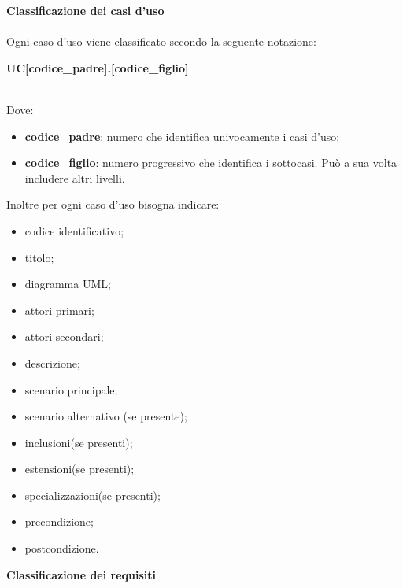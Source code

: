 			\noindent\textbf{Classificazione dei casi d'uso} \mbox{}\\ \mbox{}\\
			\noindent Ogni caso d'uso viene classificato secondo la seguente notazione: \newline \newline
			\centerline{\textbf{UC[codice\_padre].[codice\_figlio]}} \\
			Dove:
				\begin{itemize}
					\item \textbf{codice\_padre}: numero che identifica univocamente i casi 
						d'uso;
					\item \textbf{codice\_figlio}: numero progressivo che identifica i 
						sottocasi. Può a sua volta includere altri livelli. \\
				\end{itemize}
			Inoltre per ogni caso d'uso bisogna indicare:
				\begin{itemize}
					\item codice identificativo;
					\item titolo;
					\item diagramma UML\glo;
					\item attori primari;
					\item attori secondari;
					\item descrizione;
					\item scenario principale;
					\item scenario alternativo (se presente);
					\item inclusioni(se presenti);
					\item estensioni(se presenti);
					\item specializzazioni(se presenti);
					\item precondizione;
					\item postcondizione. \\
				\end{itemize}
				
			\noindent\textbf{Classificazione dei requisiti} \mbox{}\\ \label{sec:UC}
			
